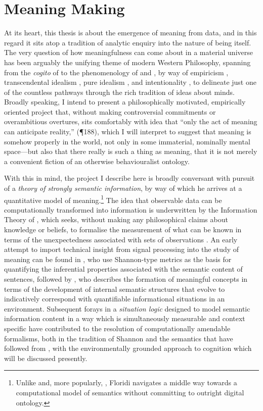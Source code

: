 \section{Meaning Making} \label{sec:meanmake}
At its heart, this thesis is about the emergence of meaning from data, and in this regard it sits atop a tradition of analytic enquiry into the nature of being itself.  The very question of how meaningfulness can come about in a material universe has been arguably the unifying theme of modern Western Philosophy, spanning from the \emph{cogito} of \cite{Descartes1911} to the phenomenology of \cite{Husserl1900} and \cite{Heidegger1926}, by way of empiricism \citep{Locke1689,Hume1738}, transcendental idealism \citep{Kant1787}, pure idealism \citep{Hegel1816}, and intentionality \citep{Brentano1874}, to delineate just one of the countless pathways through the rich tradition of ideas about minds.  Broadly speaking, I intend to present a philosophically motivated, empirically oriented project that, without making controversial commitments or overambitious overtures, sits comfortably with  idea that ``only the act of meaning can anticipate reality,'' (\P 188), which I will interpret to suggest that meaning is somehow properly in the world, not only in some immaterial, nominally mental space---but also that there really is such a thing as meaning, that it is not merely a convenient fiction of an otherwise behaviouralist ontology.

With this in mind, the project I describe here is broadly conversant with  pursuit of a \emph{theory of strongly semantic information}, by way of which he arrives at a quantitative model of meaning.\footnote{Unlike \cite{Fredkin2003} and, more popularly, \cite{Bostrom2014}, Floridi navigates a middle way towards a computational model of semantics without committing to outright digital ontology.}  The idea that observable data can be computationally transformed into information is underwritten by the Information Theory of \cite{ShannonEA1949}, which seeks, without making any philosophical claims about knowledge or beliefs, to formalise the measurement of what can be known in terms of the unexpectedness associated with sets of observations \citep[see][for a thorough treatment]{Pierce1980}.  An early attempt to import technical insight from signal processing into the study of meaning can be found in \cite{CarnapEA1952}, who use Shannon-type metrics as the basis for quantifying the inferential properties associated with the semantic content of sentences, followed by \cite{Dretske1981}, who describes the formation of meaningful concepts in terms of the development of internal semantic structures that evolve to indicatively correspond with quantifiable informational situations in an environment.  Subsequent forays in a \emph{situation logic} designed to model semantic information content in a way which is simultaneously measurable and context specific \citep{BarwiseEA1983} have contributed to the resolution of computationally amendable formalisms, both in the tradition of Shannon and the semantics that have followed from \cite{Montague1974}, with the environmentally grounded approach to cognition which will be discussed presently.

